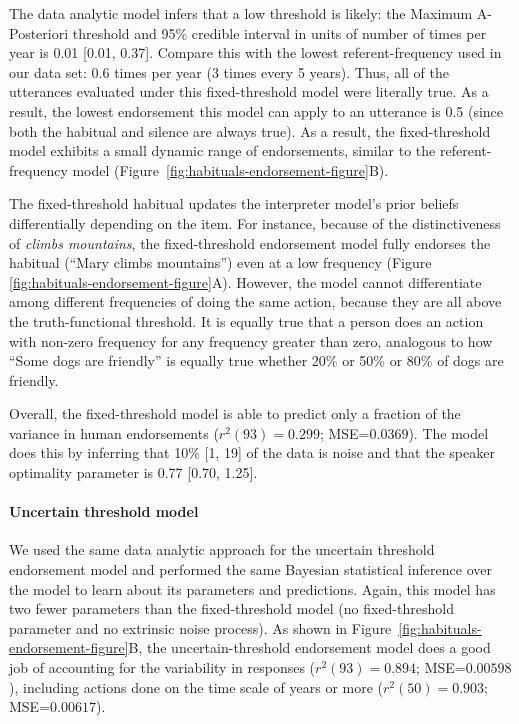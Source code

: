 \documentclass[english,,man,floatsintext]{apa6}
\let\oldparagraph\paragraph
\renewcommand{\paragraph}[1]{\oldparagraph{#1}\mbox{}}
\theoremstyle{definition}
\theoremstyle{definition}
\theoremstyle{definition}
\theoremstyle{remark}
\begin{document}
The data analytic model infers that a low threshold is likely: the
Maximum A-Posteriori threshold and 95\% credible interval in units of
number of times per year is 0.01 {[}0.01, 0.37{]}. Compare this with the
lowest referent-frequency used in our data set: \(0.6\) times per year
(3 times every 5 years). Thus, all of the utterances evaluated under
this fixed-threshold model were literally true. As a result, the lowest
endorsement this model can apply to an utterance is 0.5 (since both the
habitual and silence are always true). As a result, the fixed-threshold
model exhibits a small dynamic range of endorsements, similar to the
referent-frequency model
(Figure~\ref{fig:habituals-endorsement-figure}B).

The fixed-threshold habitual updates the interpreter model's prior
beliefs differentially depending on the item. For instance, because of
the distinctiveness of \emph{climbs mountains}, the fixed-threshold
endorsement model fully endorses the habitual (\enquote{Mary climbs
mountains}) even at a low frequency (Figure
\ref{fig:habituals-endorsement-figure}A). However, the model cannot
differentiate among different frequencies of doing the same action,
because they are all above the truth-functional threshold. It is equally
true that a person does an action with non-zero frequency for any
frequency greater than zero, analogous to how \enquote{Some dogs are
friendly} is equally true whether 20\% or 50\% or 80\% of dogs are
friendly.

Overall, the fixed-threshold model is able to predict only a fraction of
the variance in human endorsements (\(r^2(93) = 0.299\);
MSE=\(0.0369\)). The model does this by inferring that 10\% {[}1, 19{]}
of the data is noise and that the speaker optimality parameter is 0.77
{[}0.70, 1.25{]}.

\hypertarget{uncertain-threshold-model-1}{%
\paragraph{Uncertain threshold
model}\label{uncertain-threshold-model-1}}

We used the same data analytic approach for the uncertain threshold
endorsement model and performed the same Bayesian statistical inference
over the model to learn about its parameters and predictions. Again,
this model has two fewer parameters than the fixed-threshold model (no
fixed-threshold parameter and no extrinsic noise process). As shown in
Figure~\ref{fig:habituals-endorsement-figure}B, the uncertain-threshold
endorsement model does a good job of accounting for the variability in
responses (\(r^2(93) = 0.894\); MSE=\(0.00598\)), including actions done
on the time scale of years or more (\(r^2(50) = 0.903\);
MSE=\(0.00617\)).
\end{document}
